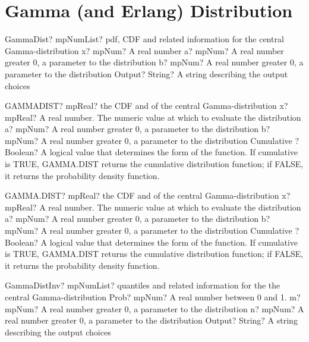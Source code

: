 \documentclass[12pt,a4paper,openany]{book}
\begin{document}
\section{Gamma (and Erlang) Distribution}

\begin{mpFunctionsExtract}
\mpFunctionFourNotImplemented
{GammaDist? mpNumList? pdf, CDF and related information for the central Gamma-distribution}
{x? mpNum? A real number}
{a? mpNum? A real number greater 0, a parameter to the distribution}
{b? mpNum? A real number greater 0, a parameter to the distribution}
{Output? String? A string describing the output choices}
\end{mpFunctionsExtract}

\begin{mpFunctionsExtract}
\mpWorksheetFunctionFourNotImplemented
{GAMMADIST? mpReal? the CDF and of the central Gamma-distribution}
{x? mpReal? A real number. The numeric value at which to evaluate the distribution}
{a? mpNum? A real number greater 0, a parameter to the distribution}
{b? mpNum? A real number greater 0, a parameter to the distribution}
{Cumulative ? Boolean? A logical value that determines the form of the function. If cumulative is TRUE, GAMMA.DIST returns the cumulative distribution function; if FALSE, it returns the probability density function.}
\end{mpFunctionsExtract}

\begin{mpFunctionsExtract}
\mpWorksheetFunctionFourNotImplemented
{GAMMA.DIST? mpReal? the CDF and of the central Gamma-distribution}
{x? mpReal? A real number. The numeric value at which to evaluate the distribution}
{a? mpNum? A real number greater 0, a parameter to the distribution}
{b? mpNum? A real number greater 0, a parameter to the distribution}
{Cumulative ? Boolean? A logical value that determines the form of the function. If cumulative is TRUE, GAMMA.DIST returns the cumulative distribution function; if FALSE, it returns the probability density function.}
\end{mpFunctionsExtract}

\begin{mpFunctionsExtract}
\mpFunctionThreeNotImplemented
{GammaDistInv? mpNumList? quantiles and related information for the the central Gamma-distribution}
{Prob? mpNum? A real number between 0 and 1.}
{m? mpNum? A real number greater 0, a parameter to the distribution}
{n? mpNum? A real number greater 0, a parameter to the distribution}
{Output? String? A string describing the output choices}
\end{mpFunctionsExtract}
\end{document}
